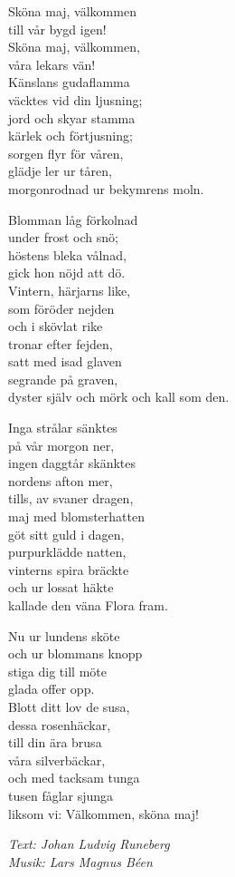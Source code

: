 \vspace{10pt}
Sköna maj, välkommen\\
till vår bygd igen! \\
Sköna maj, välkommen,\\
våra lekars vän!\\
Känslans gudaflamma\\
väcktes vid din ljusning;\\
jord och skyar stamma\\
kärlek och förtjusning;\\ 
sorgen flyr för våren,\\
glädje ler ur tåren,\\
morgonrodnad ur bekymrens moln.\par
\vspace{10pt}
Blomman låg förkolnad\\
under frost och snö;\\
höstens bleka vålnad,\\
gick hon nöjd att dö.\\
Vintern, härjarns like,\\ 
som föröder nejden\\
och i skövlat rike\\
tronar efter fejden,\\ 
satt med isad glaven\\
segrande på graven,\\
dyster själv och mörk och kall som den.\par
\newpage
Inga strålar sänktes\\
på vår morgon ner,\\
ingen daggtår skänktes\\
nordens afton mer,\\
tills, av svaner dragen,\\
maj med blomsterhatten\\
göt sitt guld i dagen,\\
purpurklädde natten,\\
vinterns spira bräckte\\ 
och ur lossat häkte\\
kallade den väna Flora fram.\par
\vspace{10pt}
Nu ur lundens sköte\\
och ur blommans knopp\\ 
stiga dig till möte\\
glada offer opp.\\
Blott ditt lov de susa,\\
dessa rosenhäckar,\\
till din ära brusa\\
våra silverbäckar,\\
och med tacksam tunga\\
tusen fåglar sjunga\\
liksom vi: Välkommen, sköna maj!
\par
\vspace{10pt}
{\footnotesize\textit{Text: Johan Ludvig Runeberg\\ Musik: Lars Magnus Béen}}
